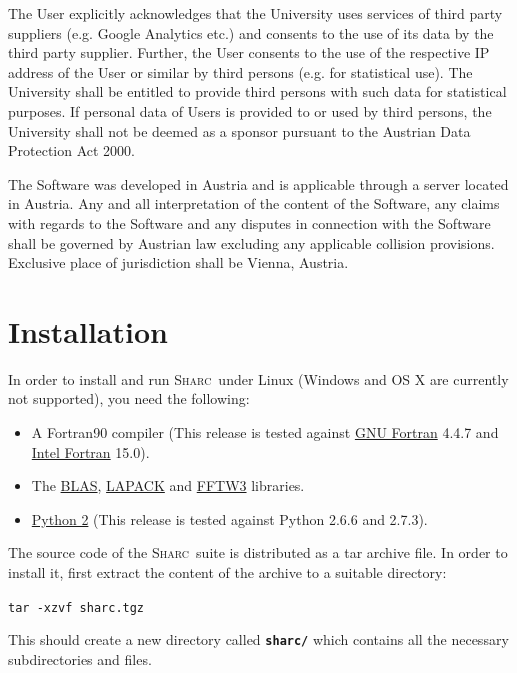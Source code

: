 \documentclass[a4paper,11pt,DIV=15,openany,twoside=false]{scrbook}
\newcommand{\sharc}{\textsc{Sharc}}
\newcommand{\ttt}[1]{\textbf{\texttt{#1}}}
\newenvironment{example}{
  \vspace{0mm}
  \definecolor{shadecolor}{HTML}{E4F4FF}
  \begin{shaded}
}{
  \end{shaded}
}
\begin{document}
{\begin{shaded}

The User explicitly acknowledges that the University uses services of third party suppliers (e.g. Google Analytics etc.) and consents to the use of its data by the third party supplier. Further, the User consents to the use of the respective IP address of the User or similar by third persons (e.g. for statistical use). The University shall be entitled to provide third persons with such data for statistical purposes. If personal data of Users is provided to or used by third persons, the University shall not be deemed as a sponsor pursuant to the Austrian Data Protection Act 2000.


The Software was developed in Austria and is applicable through a server located in Austria. Any and all interpretation of the content of the Software, any claims with regards to the Software and any disputes in connection with the Software shall be governed by Austrian law excluding any applicable collision provisions. Exclusive place of jurisdiction shall be Vienna, Austria.

\end{shaded}
}


\section{Installation}

In order to install and run \sharc\ under Linux (Windows and OS X are currently not supported), you need the following:
\begin{itemize}
  \item A Fortran90 compiler (This release is tested against \href{https://gcc.gnu.org/fortran/}{GNU Fortran} 4.4.7 and \href{https://software.intel.com/en-us/fortran-compilers}{Intel Fortran} 15.0).
  \item The \href{http://www.netlib.org/blas/}{BLAS}, \href{http://www.netlib.org/lapack/}{LAPACK} and \href{http://http://www.fftw.org/}{FFTW3} libraries.
  \item \href{https://www.python.org/downloads/release/python-278/}{Python 2} (This release is tested against Python 2.6.6 and 2.7.3).
\end{itemize}

The source code of the  \sharc\ suite is distributed as a tar archive file. In order to install it, first extract the content of the archive to a suitable directory:
\begin{example}
\verb|tar -xzvf sharc.tgz|
\end{example}
This should create a new directory called \ttt{sharc/} which contains all the necessary subdirectories and files. 
\end{document}
